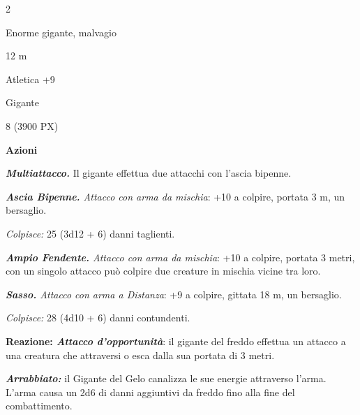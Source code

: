 \begin{multicols}{2}
{
\begin{description}[noitemsep, topsep=0pt, parsep=0pt, partopsep=0pt, itemsep=1pt, leftmargin=2.35cm,  labelwidth=2.2cm, itemindent=0cm, listparindent=0pt] %
\setlength{\baselineskip}{10pt}
\item[\textbf{Taglia/Tipo}] Enorme gigante, malvagio
\item[\textbf{Caratt.}] 
\item[\textbf{Punti Ferita}] 
\item[\textbf{Movimento}] 12 m
\item[\textbf{Tiri Salvez.}] 
\item[\textbf{Comp.}] Atletica +9
\item[\textbf{Linguaggi}] Gigante
\item[\textbf{Sfida}] 8 (3900 PX)
\end{description}
\smallskip

\textbf{Azioni}

\emph{\textbf{Multiattacco.}} Il gigante effettua due attacchi con l'ascia bipenne.

\emph{\textbf{Ascia Bipenne.} Attacco con arma da mischia}: +10 a colpire, portata 3 m, un bersaglio.

\emph{Colpisce:} 25 (3d12 + 6) danni taglienti.

\emph{\textbf{Ampio Fendente.} Attacco con arma da mischia}: +10 a colpire, portata 3 metri, con un singolo attacco può colpire due creature in mischia vicine tra loro.

\emph{\textbf{Sasso.} Attacco con arma a Distanza}: +9 a colpire, gittata 18 m, un bersaglio.

\emph{Colpisce:} 28 (4d10 + 6) danni contundenti.

\textbf{Reazione: \emph{Attacco d'opportunità}}: il gigante del freddo effettua un attacco a una creatura che attraversi o esca dalla sua portata di 3 metri.

\emph{\textbf{Arrabbiato:}} il Gigante del Gelo canalizza le sue energie attraverso l'arma. L'arma causa un 2d6 di danni aggiuntivi da freddo fino alla fine del combattimento.

}
\end{multicols}
